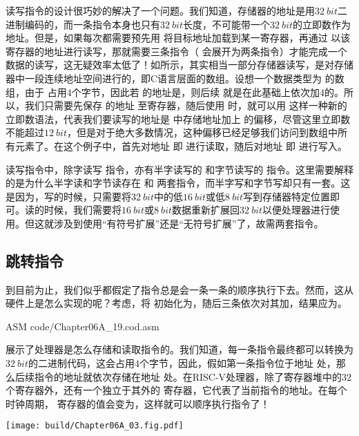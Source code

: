 读写指令的设计很巧妙的解决了一个问题。我们知道，存储器的地址是用$\SI{32}{bit}$二进制编码的，而一条指令本身也只有$\SI{32}{bit}$长度，不可能带一个$\SI{32}{bit}$的立即数作为地址。但是，如果每次都需要预先用 将目标地址加载到某一寄存器，再通过 以该寄存器的地址进行读写，那就需要三条指令（ 会展开为两条指令）才能完成一个数据的读写，这无疑效率太低了！如所示，其实相当一部分存储器读写，是对存储器中一段连续地址空间进行的，即C语言层面的数组。设想一个数据类型为 的数组，由于 占用$4$个字节，因此若 的地址是，则后续 就是在此基础上依次加$4$的。所以，我们只需要先保存 的地址 至寄存器，随后使用 时，就可以用 这样一种新的立即数语法，代表我们要读写的地址是 中存储地址加上 的偏移，尽管这里立即数 不能超过$\SI{12}{bit}$，但是对于绝大多数情况，这种偏移已经足够我们访问到数组中所有元素了。在这个例子中，首先对地址 即 进行读取，随后对地址 即 进行写入。

读写指令中，除字读写 指令，亦有半字读写的 和字节读写的 指令。这里需要解释的是为什么半字读和字节读存在 和 两套指令，而半字写和字节写却只有一套。这是因为，写的时候，只需要将$\SI{32}{bit}$中的低$\SI{16}{bit}$或低$\SI{8}{bit}$写到存储器特定位置即可。读的时候，我们需要将$\SI{16}{bit}$或$\SI{8}{bit}$数据重新扩展回$\SI{32}{bit}$以便处理器进行使用。但这就涉及到使用“有符号扩展”还是“无符号扩展”了，故需两套指令。

\subsection{跳转指令}
到目前为止，我们似乎都假定了指令总是会一条一条的顺序执行下去。然而，这从硬件上是怎么实现的呢？考虑，将 初始化为，随后三条依次对其加，结果应为。
\begin{Code}{ASM}
    code/Chapter06A_19.cod.asm
\end{Code}

展示了处理器是怎么存储和读取指令的。我们知道，每一条指令最终都可以转换为$\SI{32}{bit}$的二进制代码，这会占用$4$个字节，因此，假如第一条指令位于地址 处，那么后续指令的地址就依次存储在地址 处。在RISC-V处理器，除了寄存器堆中的$32$个寄存器外，还有一个独立于其外的 寄存器，它代表了当前指令的地址。在每个时钟周期， 寄存器的值会变为，这样就可以顺序执行指令了！
\begin{Figure}
    \texttt{[image: build/Chapter06A\_03.fig.pdf]}
\end{Figure}

